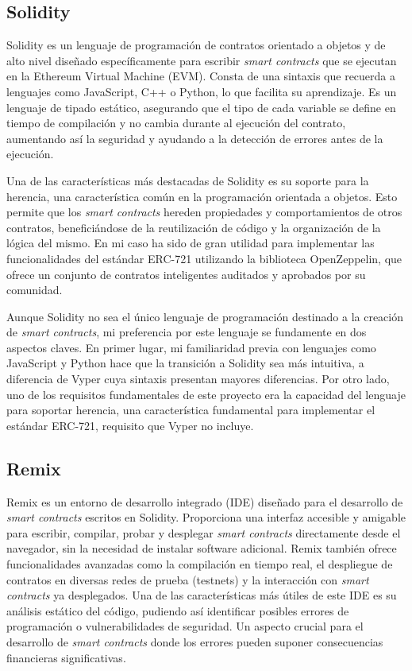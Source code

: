 \subsection{Solidity}

Solidity es un lenguaje de programación de contratos orientado a objetos y de alto nivel diseñado específicamente para escribir \textit{smart contracts} que se ejecutan en la Ethereum Virtual Machine (EVM). Consta de una sintaxis que recuerda a lenguajes como JavaScript, C++ o Python, lo que facilita su aprendizaje. 
Es un lenguaje de tipado estático, asegurando que el tipo de cada variable se define en tiempo de compilación y no cambia durante al ejecución del contrato, aumentando así la seguridad y ayudando a la detección de errores antes de la ejecución.

Una de las características más destacadas de Solidity es su soporte para la herencia, una característica común en la programación orientada a objetos. Esto permite que los \textit{smart contracts} hereden propiedades y comportamientos de otros contratos, beneficiándose de la reutilización de código y la organización de la lógica del mismo. En mi caso ha sido de gran utilidad para implementar las funcionalidades del estándar ERC-721 utilizando la biblioteca OpenZeppelin, que ofrece un conjunto de contratos inteligentes auditados y aprobados por su comunidad.

Aunque Solidity no sea el único lenguaje de programación destinado a la creación de \textit{smart contracts}, mi preferencia por este lenguaje se fundamente en dos aspectos claves.
En primer lugar, mi familiaridad previa con lenguajes como JavaScript y Python hace que la transición a Solidity sea más intuitiva, a diferencia de Vyper cuya sintaxis presentan mayores diferencias.
Por otro lado, uno de los requisitos fundamentales de este proyecto era la capacidad del lenguaje para soportar herencia, una característica fundamental para implementar el estándar ERC-721, requisito que Vyper no incluye.


\subsection{Remix}

Remix es un entorno de desarrollo integrado (IDE) diseñado para el desarrollo de \textit{smart contracts} escritos en Solidity. Proporciona una interfaz accesible y amigable para escribir, compilar, probar y desplegar \textit{smart contracts} directamente desde el navegador, sin la necesidad de instalar software adicional.
Remix también ofrece funcionalidades avanzadas como la compilación en tiempo real, el despliegue de contratos en diversas redes de prueba (testnets) y la interacción con \textit{smart contracts} ya desplegados.
Una de las características más útiles de este IDE es su análisis estático del código, pudiendo así identificar posibles errores de programación o vulnerabilidades de seguridad. Un aspecto crucial para el desarrollo de \textit{smart contracts} donde los errores pueden suponer consecuencias financieras significativas.

